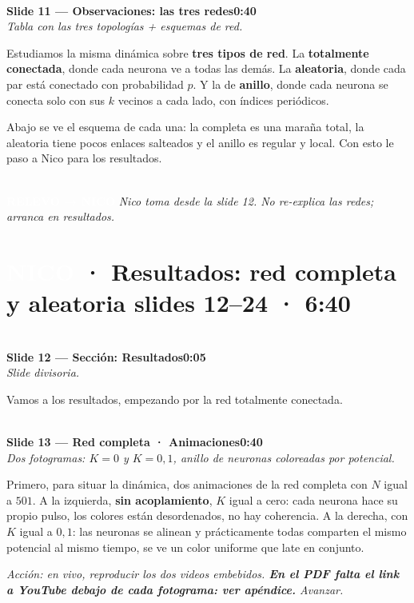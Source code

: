 \documentclass[11pt]{article}
\newcommand{\slide}[3]{%
  \vspace{6pt}%
  \noindent{\color{azulOscuro}\rule{3.2cm}{2pt}}\\[2pt]
  \noindent\textbf{\color{azulOscuro}#1}\hfill\textbf{\color{azulMedio}#3}\\[-2pt]
  {\small\color{grisTexto}\itshape #2}\\[2pt]
}
\newcommand{\quien}[2]{\noindent\colorbox{#1}{\textcolor{white}{\textbf{\;#2\;}}}}
\begin{document}
\slide{Slide 11 — Observaciones: las tres redes}{Tabla con las tres topologías + esquemas de red.}{0:40}
\begin{guion}
Estudiamos la misma dinámica sobre \textbf{tres tipos de red}. La \textbf{totalmente conectada}, donde cada neurona ve a todas las demás. La \textbf{aleatoria}, donde cada par está conectado con probabilidad $p$. Y la de \textbf{anillo}, donde cada neurona se conecta solo con sus $k$ vecinos a cada lado, con índices periódicos.

Abajo se ve el esquema de cada una: la completa es una maraña total, la aleatoria tiene pocos enlaces salteados y el anillo es regular y local. Con esto le paso a Nico para los resultados.
\end{guion}

\vspace{8pt}
\hrulefill\\
\quien{nicoColor}{RELEVO → NICO} \textit{\quad Nico toma desde la slide 12. No re-explica las redes; arranca en resultados.}

\newpage
\section{\quien{nicoColor}{NICO} · Resultados: red completa y aleatoria \hfill\normalsize\mdseries slides 12--24 · 6:40}

\slide{Slide 12 — Sección: Resultados}{Slide divisoria.}{0:05}
\begin{guion}
Vamos a los resultados, empezando por la red totalmente conectada.
\end{guion}

\slide{Slide 13 — Red completa · Animaciones}{Dos fotogramas: $K=0$ y $K=0{,}1$, anillo de neuronas coloreadas por potencial.}{0:40}
\begin{guion}
Primero, para situar la dinámica, dos animaciones de la red completa con $N$ igual a $501$. A la izquierda, \textbf{sin acoplamiento}, $K$ igual a cero: cada neurona hace su propio pulso, los colores están desordenados, no hay coherencia. A la derecha, con $K$ igual a $0{,}1$: las neuronas se alinean y prácticamente todas comparten el mismo potencial al mismo tiempo, se ve un color uniforme que late en conjunto.
\end{guion}
\textit{Acción: en vivo, reproducir los dos videos embebidos. \textbf{En el PDF falta el link a YouTube debajo de cada fotograma: ver apéndice.} Avanzar.}
\end{document}

